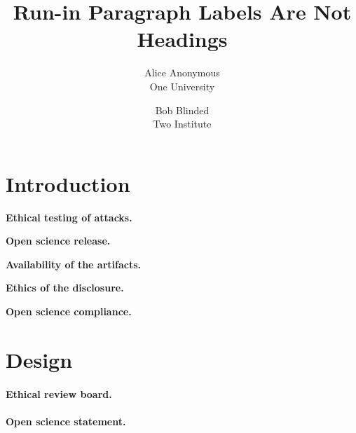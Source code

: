 \documentclass[letterpaper,twocolumn,10pt]{article}
\date{}
\title{\Large \bf Run-in Paragraph Labels Are Not Headings}
\author{{\rm Alice Anonymous}\\One University \and {\rm Bob Blinded}\\Two Institute}
\begin{document}
\maketitle

\begin{abstract}
\lipsum[1][1-5]
\end{abstract}

\section{Introduction}
\lipsum[2][1-4]

\noindent\textbf{Ethical testing of attacks.}\hspace{2em}\lipsum[3][1-1]

\noindent\textbf{Open science release.}\hspace{2em}\lipsum[4][1-1]

\noindent\textbf{Availability of the artifacts.}\hspace{2em}\lipsum[5][1-1]

\noindent\textbf{Ethics of the disclosure.}\hspace{2em}\lipsum[6][1-1]

\noindent\textbf{Open science compliance.}\hspace{2em}\lipsum[7][1-1]

\section{Design}
\lipsum[8]

\paragraph{Ethical review board.} \lipsum[8][1-3]
\paragraph{Open science statement.} \lipsum[9][1-3]
\end{document}
